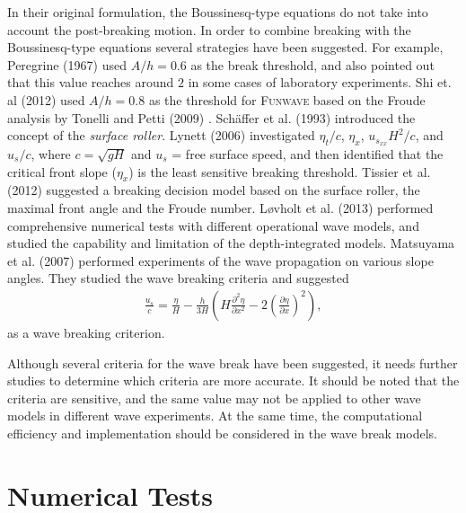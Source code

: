 \documentclass[review]{elsarticle}
\begin{document}
In their original formulation, 
the Boussinesq-type equations do not take into account 
the post-breaking motion.
In order to combine breaking with  the Boussinesq-type equations
several strategies have been suggested. 
For example, 
Peregrine (1967) \citep{peregrine1967long} used $A/h=0.6$ 
as the break threshold, and also pointed out that
this value reaches around $2$ in some cases of laboratory experiments. 
Shi et. al (2012) \citep{shi2012high} used 
$A/h = 0.8$ as the threshold 
for \textsc{Funwave} based on the Froude analysis 
by Tonelli and Petti (2009) \citep{tonelli2009hybrid}.
Sch{\"a}ffer et al. (1993) \cite{schaffer1993boussinesq} 
introduced the concept of the {\em surface roller}.
Lynett (2006) \cite{lynett2006nearshore} 
investigated $\eta_t/c$, $\eta_x$, $u_{s_{xx}} H^2/c$, and $u_s/c$, 
where $c=\sqrt{gH}$ and $u_s$ = free surface speed,
and then identified that the critical front slope ($\eta_x$) 
is the least sensitive breaking threshold. 
Tissier et al. (2012) \cite{tissier2012new} suggested
a breaking decision model based on the surface roller,
the maximal front angle and the Froude number.
L{\o}vholt et al. (2013) performed comprehensive numerical tests
with different operational wave models, 
and studied the capability and limitation of 
the depth-integrated models. 
Matsuyama et al. (2007) \cite{matsuyama2007study} performed experiments
of the wave propagation on various slope angles. 
They studied the wave breaking criteria and suggested 
\begin{align*}
\frac{u_s}{c} = \frac{\eta}{H} - \frac{h}{3H}
\left(
H\frac{\partial^2 \eta}{\partial x^2} - 2 \left(\frac{\partial \eta}{\partial x} \right)^2
\right),
\end{align*}
as a wave breaking criterion.

Although several criteria for the wave break have been suggested,
it needs further studies to determine which criteria are more accurate.
It should be noted 
that the criteria are sensitive, and 
the same value may not be applied 
to other wave models in different wave experiments.
At the same time, the computational efficiency and implementation
should be considered in the wave break models. 

\section{Numerical Tests}
\end{document}
